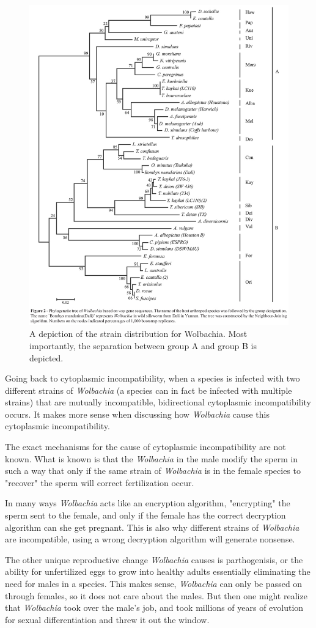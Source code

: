 \documentclass[twocolumn]{article}
\begin{document}
\begin{figure}[!ht]
    \centering
    \includegraphics[width=.4\textwidth]{images/WolbachiaTree.jpg}
    \caption{ A depiction of the strain distribution for Wolbachia. Most importantly, the separation between group A and group B is depicted. \cite{Wtree_image} }
    \label{fig:wolbachiha_tree}
\end{figure}

Going back to cytoplasmic incompatibility, when a species is infected with two different strains of \textit{Wolbachia} (a species can in fact be infected with multiple strains) that are mutually incompatible, bidirectional cytoplasmic incompatibility occurs.\cite{WbiCI} It makes more sense when discussing how \textit{Wolbachia} cause this cytoplasmic incompatibility.

The exact mechanisms for the cause of cytoplasmic incompatibility are not known. What is known is that the \textit{Wolbachia} in the male modify the sperm in such a way that only if the same strain of \textit{Wolbachia} is in the female species to "recover" the sperm will correct fertilization occur.\cite{Wbio}

In many ways \textit{Wolbachia} acts like an encryption algorithm, "encrypting" the sperm sent to the female, and only if the female has the correct decryption algorithm can she get pregnant. This is also why different strains of \textit{Wolbachia} are incompatible, using a wrong decryption algorithm will generate nonsense.

The other unique reproductive change \textit{Wolbachia} causes is parthogenisis, or the ability for unfertilized eggs to grow into healthy adults essentially eliminating the need for males in a species. This makes sense, \textit{Wolbachia} can only be passed on through females, so it does not care about the males. But then one might realize that \textit{Wolbachia} took over the male's job, and took millions of years of evolution for sexual differentiation and threw it out the window.
\end{document}
